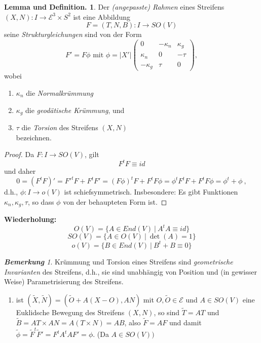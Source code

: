 \documentclass[a4paper,oneside,11pt,DIV=12,parskip=half]{scrartcl}
\newcommand{\E}{\mathcal E}
\theoremstyle{plain}
\theoremstyle{definition}
\newtheorem{remark, definition}[theorem]{Bemerkung und Definition.}
\newtheorem{lemma, definition}[theorem]{Lemma und Definition.}
\theoremstyle{remark}
\newtheorem*{remark}{\textbf{Bemerkung}}
\newtheorem*{remark, example}{\textbf{Bemerkung und Beispiel}}
\begin{document}
\begin{lemma, definition}
	
	Der \emph{(angepasste) Rahmen} eines Streifens $(X,N): I\rightarrow\E^3\times S^2$ ist eine Abbildung \[ F=(T,N,B): I\rightarrow SO(V) \] seine \emph{Strukturgleichungen} sind von der Form \[ F' = F \phi \text{ mit } \phi =|X'| \begin{pmatrix}
	0 & - \kappa_n & \kappa_g \\
	\kappa_n & 0 & -\tau\\
	-\kappa_g & \tau & 0
	\end{pmatrix}, \] wobei\begin{enumerate}
		\item $\kappa_n$ die \emph{Normalkrümmung}
		\item $\kappa_g$ die \emph{geodätische Krümmung}, und
		\item $\tau$ die \emph{Torsion} des Streifens $(X,N)$ \\ bezeichnen.
		
	\end{enumerate}

\begin{proof}
	Da $F: I \rightarrow SO(V)$, gilt \[F^tF \equiv id\] und daher \[ 0 = (F^tF)' = F'^tF + F^tF' = (F\phi)^tF + F^tF\phi = \phi^tF^tF + F^tF\phi = \phi^t+ \phi  ~,\] d.h., $\phi:I \rightarrow o(V)$ ist schiefsymmetrisch. Insbesondere: Es gibt Funktionen $\kappa_n, \kappa_g, \tau$, so dass $\phi$ von der behaupteten Form ist.
\end{proof}

\textbf{Wiederholung:}
$$O(V) = \{ A \in End(V) ~ | ~ A^tA\equiv id \}$$
$$SO(V) = \{ A \in O(V) ~ | ~\det(A) = 1 \}$$
$$o(V) = \{ B \in End(V) ~ | ~ B^t +B \equiv 0 \}$$

\begin{remark}
	Krümmung und Torsion eines Streifens sind \emph{geometrische Invarianten} des Streifens, d.h., sie sind unabhängig von Position und (in gewisser Weise) Parametrisierung des Streifens.
	
	\begin{enumerate}
		\item ist $(\widetilde{X}, \widetilde{N}) = (\widetilde{O} + A(X-O), AN)$ mit $O,\widetilde{O} \in \E$ und $A \in SO(V)$ eine Euklidsche Bewegung des Streifens $(X,N)$, so sind $\widetilde{T}= AT$ und $\widetilde{B}= AT\times AN = A(T\times N) = AB$, also $\widetilde{F}=AF$ und damit $\widetilde{\phi} = \widetilde{F}^t\widetilde{F}'= F^tA^tAF' = \phi$. (Da $A \in SO(V))$
		

\end{enumerate}
\end{remark}
\end{lemma, definition}
\end{document}
